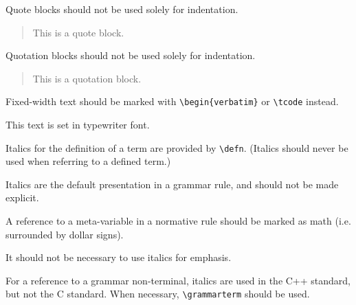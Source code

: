 Quote blocks should not be used solely for indentation.
\begin{quote}
This is a quote block.
\end{quote}

Quotation blocks should not be used solely for indentation.
\begin{quotation}
This is a quotation block.
\end{quotation}

Fixed-width text should be marked with
\verb`\`\verb`begin{verbatim}`
or
\verb`\tcode`
instead.

{\ttfamily
This text is set in typewriter font.
}

Italics for the definition of a term are provided by
\verb`\defn`.
(Italics should never be used when referring to a defined term.)

Italics are the default presentation in a grammar rule,
and should not be made explicit.

A reference to a meta-variable in a normative rule
should be marked as math
(i.e. surrounded by dollar signs).

It should not be necessary to use italics for emphasis.

For a reference to a grammar non-terminal,
italics are used in the C++ standard,
but not the C standard.
When necessary, \verb`\grammarterm` should be used.
